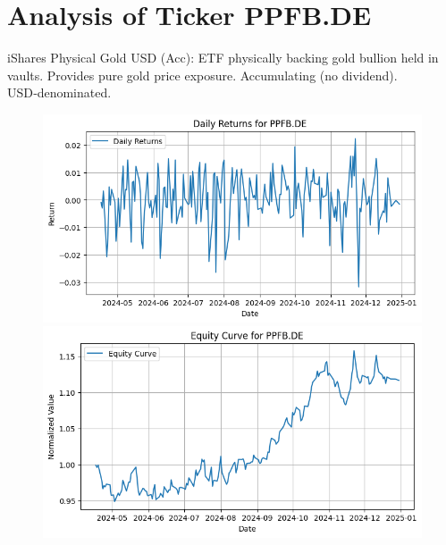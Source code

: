 \documentclass{article}%
\begin{document}
%
\newpage

%
\section*{Analysis of Ticker PPFB.DE}%
\label{sec:AnalysisofTickerPPFB.DE}%
iShares Physical Gold USD (Acc): ETF physically backing gold bullion held in vaults. Provides pure gold price exposure. Accumulating (no dividend). USD‑denominated.%


\begin{figure}[htbp]%
\begin{minipage}{0.49\textwidth}%
\includegraphics[width=\linewidth]{ticker_images/PPFB.DE_daily_returns.png}%
\end{minipage}%
\begin{minipage}{0.49\textwidth}%
\includegraphics[width=\linewidth]{ticker_images/PPFB.DE_equity_curve.png}%
\end{minipage}%
\end{figure}

%
\end{document}
